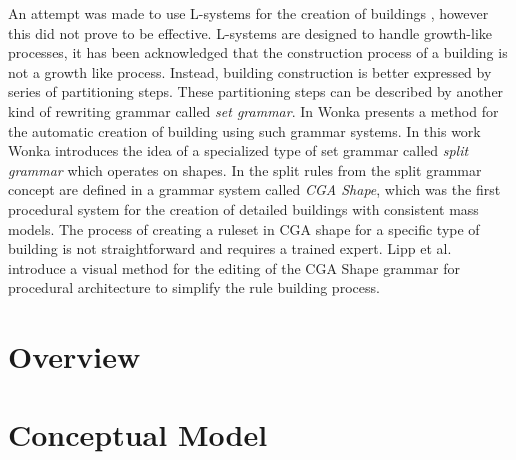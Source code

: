 \documentclass{article}
\begin{document}
An attempt was made to use L-systems for the creation of buildings \cite{Parish01}, however this did not prove to be effective. L-systems are designed to handle growth-like processes, it has been acknowledged that the construction process of a building is not a growth like process. Instead, building construction is better expressed by series of partitioning steps. These partitioning steps can be described by another kind of rewriting grammar called \emph{set grammar}. In \cite{Wonka03} Wonka presents a method for the automatic creation of building using such grammar systems. In this work Wonka introduces the idea of a specialized type of set grammar called \emph{split grammar} which operates on shapes. In \cite{Muller06} the split rules from the split grammar concept are defined in a grammar system called \emph{CGA Shape}, which was the first procedural system for the creation of detailed buildings with consistent mass 
models. The process of creating a ruleset in CGA shape for a specific type of building is not straightforward and requires a trained expert. Lipp et al. \cite{Lipp08} introduce a visual method for the editing of the CGA Shape grammar for procedural architecture to simplify the rule building process. 





\section{Overview}

%
%
%
%
%







\section{Conceptual Model}
\end{document}
